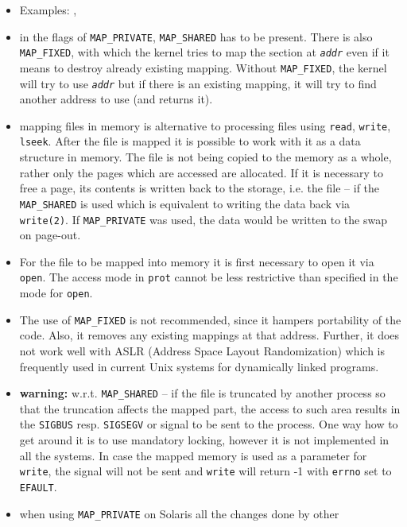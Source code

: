 \begin{itemize}
\setlength{\itemsep}{0.8\itemsep}
\item Examples: , 
\item in the flags  of \texttt{MAP\_PRIVATE},
\texttt{MAP\_SHARED} has to be present.
There is also \texttt{MAP\_FIXED}, with which the
kernel tries to map the section at \emph{\texttt{addr}} even if it means to
destroy already existing mapping.  Without \texttt{MAP\_FIXED}, the kernel
will try to use \emph{\texttt{addr}} but if there is an existing mapping, it
will try to find another address to use (and returns it).
\item mapping files in memory is alternative to processing files using
\texttt{read}, \texttt{write}, \texttt{lseek}.  After the file is mapped it is
possible to work with it as a data structure in memory. The file is not being
copied to the memory as a whole, rather only the pages which are accessed are
allocated. If it is necessary to free a page, its contents is written back
to the storage, i.e. the file -- if the \texttt{MAP\_SHARED} is used
which is equivalent to writing the data back via \texttt{write(2)}.  If
\texttt{MAP\_PRIVATE} was used, the data would be written to the swap on
page-out.
\item For the file to be mapped into memory it is first necessary to open it
via \texttt{open}. The access mode in \texttt{prot} cannot be less restrictive
than specified in the mode for \texttt{open}.
\item The use of \texttt{MAP\_FIXED} is not recommended, since it hampers
portability of the code. Also, it removes any existing mappings at that
address. Further, it does not work well with ASLR (Address Space Layout
Randomization) which is frequently used in current Unix systems for dynamically
linked programs.
\item \textbf{warning:} w.r.t. \texttt{MAP\_SHARED} -- if the file is truncated
by another process so that the truncation affects the mapped part, the access
to such area results in the \texttt{SIGBUS} resp. \texttt{SIGSEGV} or signal
to be sent to the process. One way how to get around it is to use
mandatory locking, however it is not implemented in all the systems.
In case the mapped memory is used as a parameter for \texttt{write},
the signal will not be sent and \texttt{write} will return -1
with \texttt{errno} set to \texttt{EFAULT}.
\item when using \texttt{MAP\_PRIVATE} on Solaris all the changes done by other

\end{itemize}
